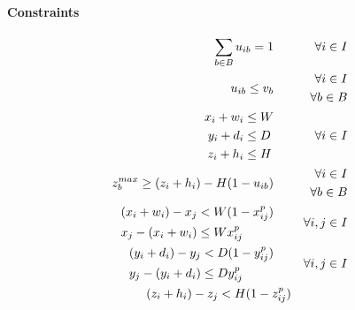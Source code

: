 \paragraph*{Constraints}
\begin{align}
    \sum_{b \in B} u_{ib} = 1 \hspace{.5cm}& & \forall i \in I  \label{cons:all_items_in_bin} \\
    u_{ib} \le v_b \hspace{.5cm}& & \begin{aligned} \forall i \in I \\ 
                                                    \forall b \in B 
                                    \end{aligned} \label{cons:items_in_used_bins} \\
    \begin{aligned} x_i + w_i &\le W \\ 
                    y_i + d_i &\le D \\
                    z_i + h_i &\le H \\ \end{aligned} \hspace{.5cm}& & \forall i \in I \label{cons:inside} \\
    z^{max}_b \ge (z_i + h_i) - H(1-u_{ib}) \hspace{.5cm}& & \begin{aligned} \forall i \in I \\ 
                                                                    \forall b \in B 
                                                            \end{aligned} \label{cons:maxz} \\
    \begin{aligned} (x_i + w_i) - x_j &< W(1 - x^p_{ij}) \\
                    x_j - (x_i + w_i) &\le W x^p_{ij} \end{aligned} \hspace{.5cm}& & \forall i,j \in I \label{cons:x_prec} \\
    \begin{aligned} (y_i + d_i) - y_j &< D(1 - y^p_{ij}) \\
                    y_j - (y_i + d_i) &\le D y^p_{ij} \end{aligned} \hspace{.5cm}& & \forall i,j \in I \label{cons:y_prec} \\
    \begin{aligned} (z_i + h_i) - z_j &< H(1 - z^p_{ij}) \\

\end{aligned}
\end{align}
